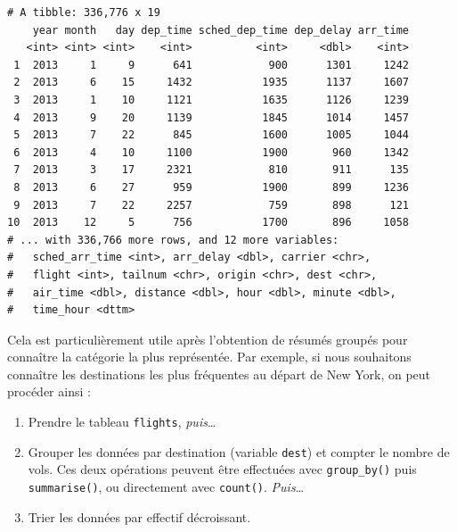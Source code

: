 \documentclass[a4paperpaper,]{article}
\newenvironment{Shaded}{\begin{snugshade}}{\end{snugshade}}
\newcommand{\KeywordTok}[1]{\textcolor[rgb]{0.12,0.11,0.11}{\textbf{#1}}}
\newcommand{\NormalTok}[1]{\textcolor[rgb]{0.12,0.11,0.11}{#1}}
\newcommand{\OperatorTok}[1]{\textcolor[rgb]{0.12,0.11,0.11}{#1}}
\newcommand{\StringTok}[1]{\textcolor[rgb]{0.75,0.01,0.01}{#1}}
\providecommand{\tightlist}{%
  \setlength{\itemsep}{0pt}\setlength{\parskip}{0pt}}
\begin{document}
\begin{verbatim}
# A tibble: 336,776 x 19
    year month   day dep_time sched_dep_time dep_delay arr_time
   <int> <int> <int>    <int>          <int>     <dbl>    <int>
 1  2013     1     9      641            900      1301     1242
 2  2013     6    15     1432           1935      1137     1607
 3  2013     1    10     1121           1635      1126     1239
 4  2013     9    20     1139           1845      1014     1457
 5  2013     7    22      845           1600      1005     1044
 6  2013     4    10     1100           1900       960     1342
 7  2013     3    17     2321            810       911      135
 8  2013     6    27      959           1900       899     1236
 9  2013     7    22     2257            759       898      121
10  2013    12     5      756           1700       896     1058
# ... with 336,766 more rows, and 12 more variables:
#   sched_arr_time <int>, arr_delay <dbl>, carrier <chr>,
#   flight <int>, tailnum <chr>, origin <chr>, dest <chr>,
#   air_time <dbl>, distance <dbl>, hour <dbl>, minute <dbl>,
#   time_hour <dttm>
\end{verbatim}

Cela est particulièrement utile après l'obtention de résumés groupés pour connaître la catégorie la plus représentée. Par exemple, si nous souhaitons connaître les destinations les plus fréquentes au départ de New York, on peut procéder ainsi :

\begin{enumerate}
\def\labelenumi{\arabic{enumi}.}
\tightlist
\item
  Prendre le tableau \texttt{flights}, \emph{puis}\ldots{}
\item
  Grouper les données par destination (variable \texttt{dest}) et compter le nombre de vols. Ces deux opérations peuvent être effectuées avec \texttt{group\_by()} puis \texttt{summarise()}, ou directement avec \texttt{count()}. \emph{Puis}\ldots{}
\item
  Trier les données par effectif décroissant.
\end{enumerate}

\begin{Shaded}
\end{Shaded}
\end{document}
